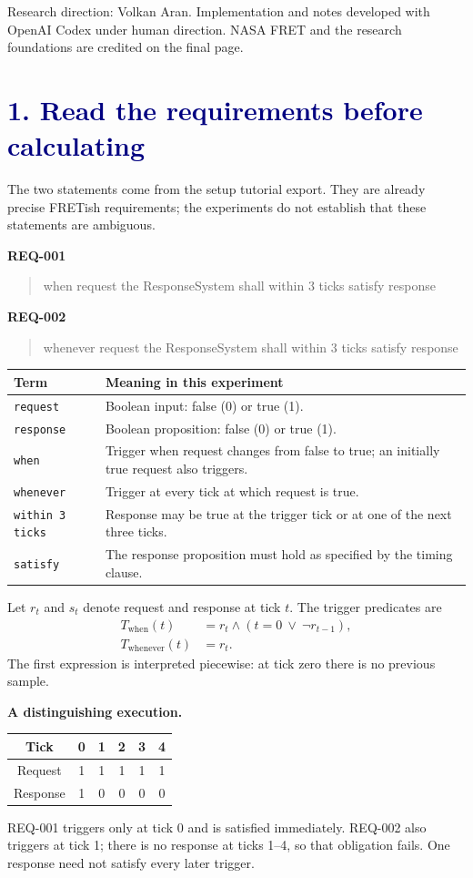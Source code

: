 \documentclass[11pt,a4paper]{article}
\newcommand{\lesson}[2]{\section*{\textcolor{navy}{#1. #2}}}
\begin{document}
\vfill
\small Research direction: Volkan Aran. Implementation and notes developed with OpenAI Codex under human direction. NASA FRET and the research foundations are credited on the final page.
\newpage

\lesson{1}{Read the requirements before calculating}
The two statements come from the setup tutorial export. They are already precise FRETish requirements; the experiments do not establish that these statements are ambiguous.

\textbf{REQ-001}
\begin{quote}\ttfamily when request the ResponseSystem shall within 3 ticks satisfy response\end{quote}
\textbf{REQ-002}
\begin{quote}\ttfamily whenever request the ResponseSystem shall within 3 ticks satisfy response\end{quote}

\begin{tabular}{p{31mm}p{109mm}}
\toprule
\textbf{Term} & \textbf{Meaning in this experiment}\\\midrule
\texttt{request} & Boolean input: false (0) or true (1).\\
\texttt{response} & Boolean proposition: false (0) or true (1).\\
\texttt{when} & Trigger when request changes from false to true; an initially true request also triggers.\\
\texttt{whenever} & Trigger at every tick at which request is true.\\
\texttt{within 3 ticks} & Response may be true at the trigger tick or at one of the next three ticks.\\
\texttt{satisfy} & The response proposition must hold as specified by the timing clause.\\\bottomrule
\end{tabular}

Let \(r_t\) and \(s_t\) denote request and response at tick \(t\). The trigger predicates are
\begin{align*}
T_{\mathrm{when}}(t)&=r_t\land(t=0\ \lor\ \neg r_{t-1}),\\
T_{\mathrm{whenever}}(t)&=r_t.
\end{align*}
The first expression is interpreted piecewise: at tick zero there is no previous sample.

\textbf{A distinguishing execution.}
\begin{center}
\begin{tabular}{c|ccccc}
\toprule
Tick & 0 & 1 & 2 & 3 & 4\\\midrule
Request & 1 & 1 & 1 & 1 & 1\\
Response & 1 & 0 & 0 & 0 & 0\\\bottomrule
\end{tabular}
\end{center}
REQ-001 triggers only at tick 0 and is satisfied immediately. REQ-002 also triggers at tick 1; there is no response at ticks 1--4, so that obligation fails. One response need not satisfy every later trigger.
\end{document}
